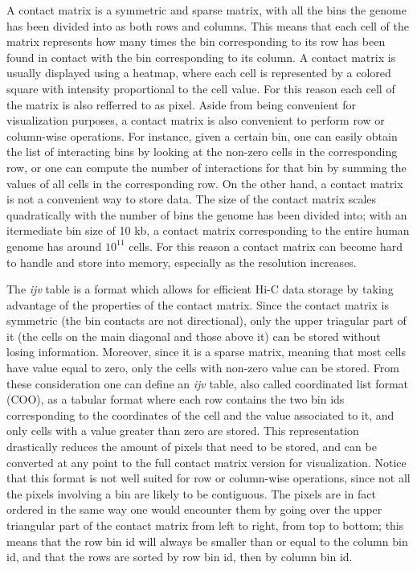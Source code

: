 A contact matrix is a symmetric and sparse matrix, with all the bins the genome has been divided into as both rows and columns. This means that each cell of the matrix represents how many times the bin corresponding to its row has been found in contact with the bin corresponding to its column. A contact matrix is usually displayed using a heatmap, where each cell is represented by a colored square with intensity proportional to the cell value. For this reason each cell of the matrix is also refferred to as pixel. Aside from being convenient for visualization purposes, a contact matrix is also convenient to perform row or column-wise operations. For instance, given a certain bin, one can easily obtain the list of interacting bins by looking at the non-zero cells in the corresponding row, or one can compute the number of interactions for that bin by summing the values of all cells in the corresponding row. On the other hand, a contact matrix is not a convenient way to store data. The size of the contact matrix scales quadratically with the number of bins the genome has been divided into; with an itermediate bin size of 10 kb, a contact matrix corresponding to the entire human genome has around $10^{11}$ cells. For this reason a contact matrix can become hard to handle and store into memory, especially as the resolution increases.

The \emph{ijv} table is a format which allows for efficient Hi-C data storage by taking advantage of the properties of the contact matrix. Since the contact matrix is symmetric (the bin contacts are not directional), only the upper triagular part of it (the cells on the main diagonal and those above it) can be stored without losing information. Moreover, since it is a sparse matrix, meaning that most cells have value equal to zero, only the cells with non-zero value can be stored. From these consideration one can define an \emph{ijv} table, also called coordinated list format (COO), as a tabular format where each row contains the two bin ids corresponding to the coordinates of the cell and the value associated to it, and only cells with a value greater than zero are stored. This representation drastically reduces the amount of pixels that need to be stored, and can be converted at any point to the full contact matrix version for visualization. Notice that this format is not well suited for row or column-wise operations, since not all the pixels involving a bin are likely to be contiguous. The pixels are in fact ordered in the same way one would encounter them by going over the upper triangular part of the contact matrix from left to right, from top to bottom; this means that the row bin id will always be smaller than or equal to the column bin id, and that the rows are sorted by row bin id, then by column bin id.

